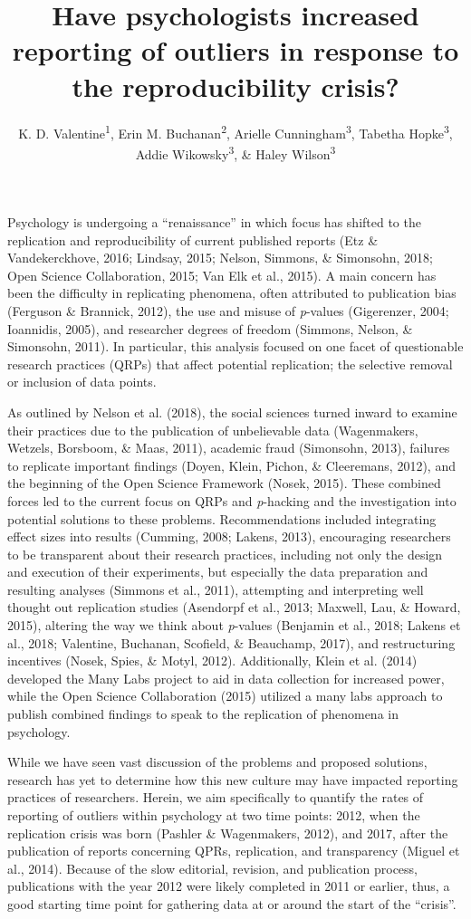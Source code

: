 \documentclass[english,,man]{apa6}
\title{Have psychologists increased reporting of outliers in response to the reproducibility crisis?}
\author{K. D. Valentine\textsuperscript{1}, Erin M. Buchanan\textsuperscript{2}, Arielle Cunningham\textsuperscript{3}, Tabetha Hopke\textsuperscript{3}, Addie Wikowsky\textsuperscript{3}, \& Haley Wilson\textsuperscript{3}}
\date{}
\affiliation{
\vspace{0.5cm}
\textsuperscript{1} University of Missouri\\\textsuperscript{2} Harrisburg University of Science and Technology\\\textsuperscript{3} Missouri State University}
\begin{document}
\maketitle

Psychology is undergoing a \enquote{renaissance} in which focus has shifted to the replication and reproducibility of current published reports (Etz \& Vandekerckhove, 2016; Lindsay, 2015; Nelson, Simmons, \& Simonsohn, 2018; Open Science Collaboration, 2015; Van Elk et al., 2015). A main concern has been the difficulty in replicating phenomena, often attributed to publication bias (Ferguson \& Brannick, 2012), the use and misuse of \emph{p}-values (Gigerenzer, 2004; Ioannidis, 2005), and researcher degrees of freedom (Simmons, Nelson, \& Simonsohn, 2011). In particular, this analysis focused on one facet of questionable research practices (QRPs) that affect potential replication; the selective removal or inclusion of data points.

As outlined by Nelson et al. (2018), the social sciences turned inward to examine their practices due to the publication of unbelievable data (Wagenmakers, Wetzels, Borsboom, \& Maas, 2011), academic fraud (Simonsohn, 2013), failures to replicate important findings (Doyen, Klein, Pichon, \& Cleeremans, 2012), and the beginning of the Open Science Framework (Nosek, 2015). These combined forces led to the current focus on QRPs and \emph{p}-hacking and the investigation into potential solutions to these problems. Recommendations included integrating effect sizes into results (Cumming, 2008; Lakens, 2013), encouraging researchers to be transparent about their research practices, including not only the design and execution of their experiments, but especially the data preparation and resulting analyses (Simmons et al., 2011), attempting and interpreting well thought out replication studies (Asendorpf et al., 2013; Maxwell, Lau, \& Howard, 2015), altering the way we think about \emph{p}-values (Benjamin et al., 2018; Lakens et al., 2018; Valentine, Buchanan, Scofield, \& Beauchamp, 2017), and restructuring incentives (Nosek, Spies, \& Motyl, 2012). Additionally, Klein et al. (2014) developed the Many Labs project to aid in data collection for increased power, while the Open Science Collaboration (2015) utilized a many labs approach to publish combined findings to speak to the replication of phenomena in psychology.

While we have seen vast discussion of the problems and proposed solutions, research has yet to determine how this new culture may have impacted reporting practices of researchers. Herein, we aim specifically to quantify the rates of reporting of outliers within psychology at two time points: 2012, when the replication crisis was born (Pashler \& Wagenmakers, 2012), and 2017, after the publication of reports concerning QPRs, replication, and transparency (Miguel et al., 2014). Because of the slow editorial, revision, and publication process, publications with the year 2012 were likely completed in 2011 or earlier, thus, a good starting time point for gathering data at or around the start of the \enquote{crisis}.
\end{document}
